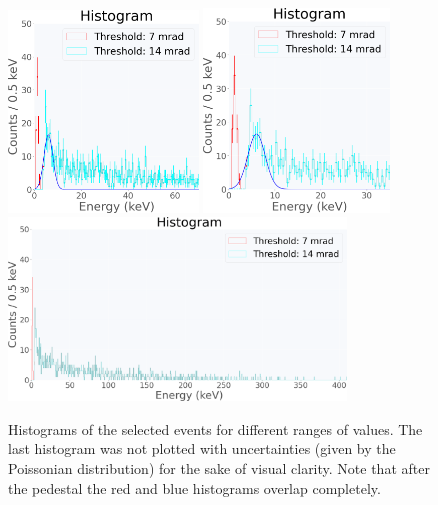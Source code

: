 \documentclass[12pt]{article}
\begin{document}
\begin{figure}[H]
\centering
\vspace*{0.4cm}
\includegraphics[width=0.45\textwidth]{Figure_1.png}
\hfill
\includegraphics[width=0.44\textwidth]{Figure_2.png}\\
\vspace{0.8cm}
\includegraphics[width=0.8\textwidth]{Figure_3.png}
\caption{Histograms of the selected events for different ranges of values. The last histogram was not plotted with uncertainties (given by the Poissonian distribution) for the sake of visual clarity. Note that after the pedestal the red and blue histograms overlap completely.}
\end{figure}
\end{document}
